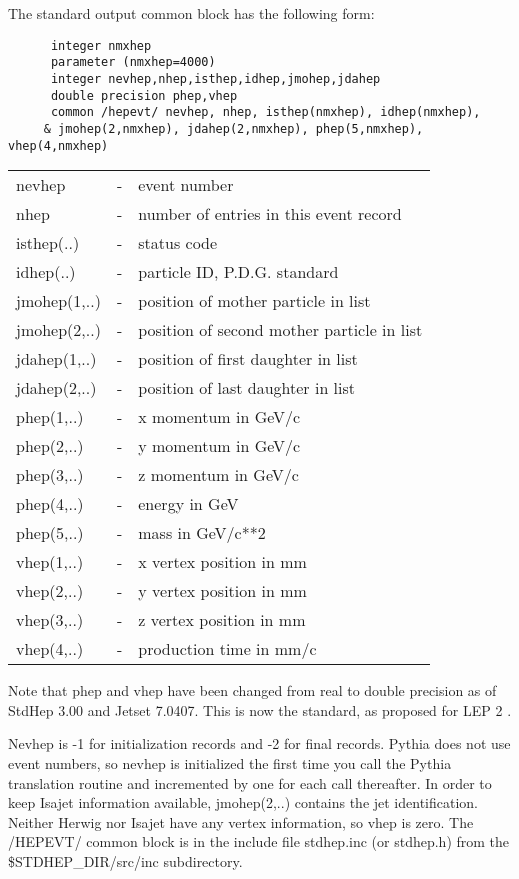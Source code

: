 \noindent The standard output common block has the following form:
\begin{verbatim}
      integer nmxhep
      parameter (nmxhep=4000)
      integer nevhep,nhep,isthep,idhep,jmohep,jdahep
      double precision phep,vhep
      common /hepevt/ nevhep, nhep, isthep(nmxhep), idhep(nmxhep),
     & jmohep(2,nmxhep), jdahep(2,nmxhep), phep(5,nmxhep), vhep(4,nmxhep)
\end{verbatim}
\begin{center}
\begin{tabular}{lcl}
nevhep      &-&event number \\
nhep        &-&number of entries in this event record \\
isthep(..)  &-&status code \\
idhep(..)   &-&particle ID, P.D.G. standard \\
jmohep(1,..)&-&position of mother particle in list \\
jmohep(2,..)&-&position of second mother particle in list \\ 
jdahep(1,..)&-&position of first daughter in list \\
jdahep(2,..)&-&position of last daughter in list \\
phep(1,..)  &-&x momentum in GeV/c \\
phep(2,..)  &-&y momentum in GeV/c \\
phep(3,..)  &-&z momentum in GeV/c \\
phep(4,..)  &-&energy in GeV \\
phep(5,..)  &-&mass in GeV/c**2\\
vhep(1,..)  &-&x vertex position in mm \\
vhep(2,..)  &-&y vertex position in mm \\
vhep(3,..)  &-&z vertex position in mm \\
vhep(4,..)  &-&production time in mm/c \\
\end{tabular}
\end{center}

Note that phep and vhep have been changed from real to double precision
as of StdHep 3.00 and Jetset 7.0407. 
This is now the standard, as proposed for LEP 2 \cite{lund}.

Nevhep is -1 for initialization records and -2 for final records.  
Pythia does not use event numbers, so nevhep is initialized the first time
you call the Pythia translation routine and incremented by one for 
each call thereafter.
In order to keep Isajet information available, jmohep(2,..) contains the
jet identification.  Neither Herwig nor Isajet have any vertex information,
so vhep is zero.  The /HEPEVT/ common block is in
the include file stdhep.inc (or stdhep.h) from the \$STDHEP\_DIR/src/inc 
subdirectory.

